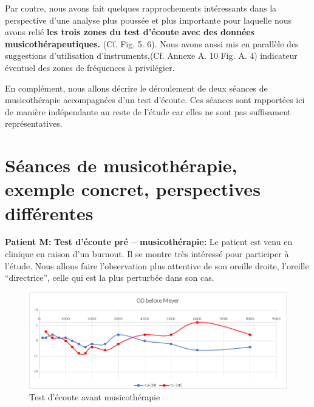Par contre, nous avons fait quelques rapprochements intéressants dans la perspective d'une analyse plus
poussée et plus importante pour laquelle nous avons  relié\textbf{ les trois zones du
test d'écoute avec des données musicothérapeutiques.}
(Cf. Fig. 5. 6).
Nous avons aussi mis
en parallèle des suggestions d'utilisation d'instruments,(Cf. Annexe A. 10 Fig. A. 4)
indicateur éventuel des zones de fréquences à
privilégier.



En complément, nous allons décrire le déroulement de deux séances de
musicothérapie accompagnées d'un test d'écoute. Ces séances sont rapportées ici de
manière indépendante au reste de l'étude car elles ne sont pas
suffisament représentatives.

\section{ Séances de musicothérapie, exemple concret, perspectives différentes               }
\textbf{Patient M:}
\textbf{ Test d'écoute pré -- musicothérapie:}
 	Le patient est venu en clinique en raison d'un burnout. Il se montre très
        intéressé pour participer à l'étude. Nous allons faire
        l'observation plus attentive de
        son oreille droite, l'oreille ``directrice'',
        celle qui est la plus perturbée dans son cas.


 	\begin{figure}[tbh]
 		\centering
 		\includegraphics[width=1\linewidth]{images/clinique/od_before_meyer.png}
 		\caption{Test d'écoute avant musicothérapie}
 		\label{fig:odbeforemeyer}
 	\end{figure}


